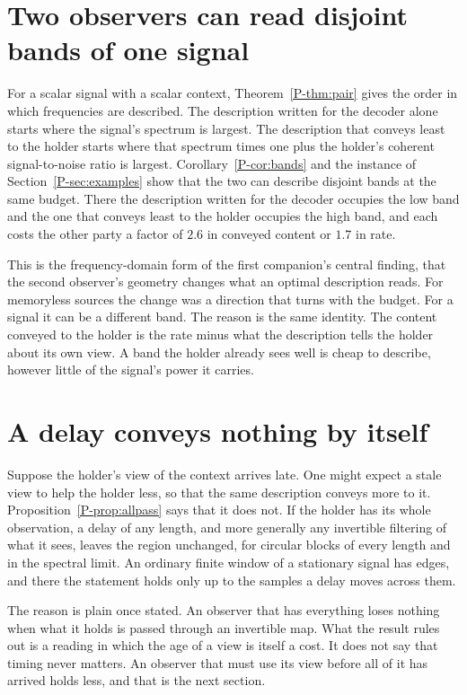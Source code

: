 \documentclass[11pt]{article}
\newcommand{\Th}[1]{Theorem~\ref{P-#1}}
\newcommand{\Pp}[1]{Proposition~\ref{P-#1}}
\newcommand{\Co}[1]{Corollary~\ref{P-#1}}
\newcommand{\Se}[1]{Section~\ref{P-#1}}
\begin{document}
\section{Two observers can read disjoint bands of one signal}
\label{sec:bands}

For a scalar signal with a scalar context, \Th{thm:pair} gives the order
in which frequencies are described. The description written for the
decoder alone starts where the signal's spectrum is largest. The
description that conveys least to the holder starts where that spectrum
times one plus the holder's coherent signal-to-noise ratio is largest.
\Co{cor:bands} and the instance of \Se{sec:examples} show that the two
can describe disjoint bands at the same budget. There the description
written for the decoder occupies the low band and the one that conveys
least to the holder occupies the high band, and each costs the other
party a factor of $2.6$ in conveyed content or $1.7$ in rate.

This is the frequency-domain form of the first companion's central
finding, that the second observer's geometry changes what an optimal
description reads. For memoryless sources the change was a direction
that turns with the budget. For a signal it can be a different band.
The reason is the same identity. The content conveyed to the holder is
the rate minus what the description tells the holder about its own
view. A band the holder already sees well is cheap to describe, however
little of the signal's power it carries.

\section{A delay conveys nothing by itself}
\label{sec:delay}

Suppose the holder's view of the context arrives late. One might expect
a stale view to help the holder less, so that the same description
conveys more to it. \Pp{prop:allpass} says that it does not. If the
holder has its whole observation, a delay of any length, and more
generally any invertible filtering of what it sees, leaves the region
unchanged, for circular blocks of every length and in the spectral
limit. An ordinary finite window of a stationary signal has edges, and
there the statement holds only up to the samples a delay moves across
them.

The reason is plain once stated. An observer that has everything loses
nothing when what it holds is passed through an invertible map. What
the result rules out is a reading in which the age of a view is itself
a cost. It does not say that timing never matters. An observer that
must use its view before all of it has arrived holds less, and that is
the next section.
\end{document}
